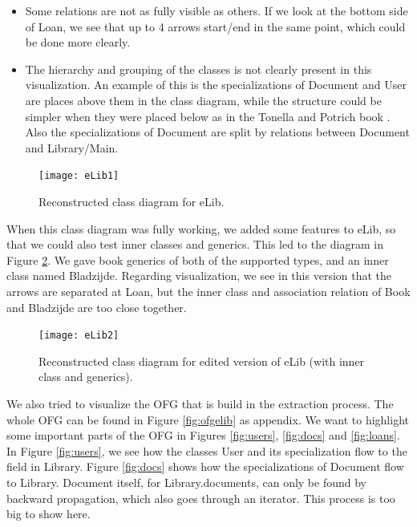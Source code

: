 \documentclass[a4paper,11pt]{article}
\begin{document}
			\begin{itemize}
				\item Some relations are not as fully visible as others. If we look at the bottom side of Loan, we see that up to 4 arrows start/end in the same point, which could be done more clearly.
				\item The hierarchy and grouping of the classes is not clearly present in this visualization. An example of this is the specializations of Document and User are places above them in the class diagram, while the structure could be simpler when they were placed below as in the Tonella and Potrich book \cite{tonella}. Also the specializations of Document are split by relations between Document and Library/Main.
			\end{itemize}
			
			\begin{figure}[h!]
				\centering
				\texttt{[image: eLib1]}
				\caption{Reconstructed class diagram for eLib.}
				\label{fig:elib1}
			\end{figure}
			
			When this class diagram was fully working, we added some features to eLib, so that we could also test inner classes and generics. This led to the diagram in Figure \ref{fig:elib2}. We gave book generics of both of the supported types, and an inner class named Bladzijde. Regarding visualization, we see in this version that the arrows are separated at Loan, but the inner class and association relation of Book and Bladzijde are too close together. \\

			\begin{figure}[h!]
				\centering
				\texttt{[image: eLib2]}
				\caption{Reconstructed class diagram for edited version of eLib (with inner class and generics).}
				\label{fig:elib2}
			\end{figure}

			We also tried to visualize the OFG that is build in the extraction process. The whole OFG can be found in Figure \ref{fig:ofgelib} as appendix. We want to highlight some important parts of the OFG in Figures \ref{fig:users}, \ref{fig:docs} and \ref{fig:loans}. In Figure \ref{fig:users}, we see how the classes User and its specialization flow to the field in Library. Figure \ref{fig:docs} shows how the specializations of Document flow to Library. Document itself, for Library.documents, can only be found by backward propagation, which also goes through an iterator. This process is too big to show here. \\
\end{document}
